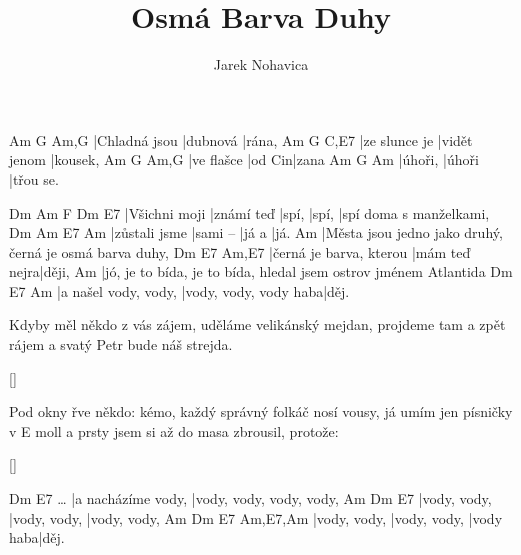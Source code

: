 \documentclass{song}
\author{Jarek Nohavica}
\title{Osmá Barva Duhy}
\begin{document}
\strophe
Am            G        Am,G
|Chladná jsou |dubnová |rána,
Am            G            C,E7
|ze slunce je |vidět jenom |kousek,
Am         G      Am,G
|ve flašce |od Cin|zana
Am      G      Am
|úhoři, |úhoři |třou se.
\endstrophe

Dm            Am         F     Dm    E7
|Všichni moji |známí teď |spí, |spí, |spí doma s manželkami,
Dm            Am       E7    Am
|zůstali jsme |sami -- |já a |já.
Am
|Města jsou jedno jako druhý, černá je osmá barva duhy,
Dm                      E7            Am,E7
|černá je barva, kterou |mám teď nejra|ději,
Am
|jó, je to bída, je to bída, hledal jsem ostrov jménem Atlantida
Dm                   E7                    Am
|a našel vody, vody, |vody, vody, vody haba|děj.
\endstrophe

\strophe*
Kdyby měl někdo z vás zájem,
uděláme velikánský mejdan,
projdeme tam a zpět rájem
a svatý Petr bude náš strejda.
\endstrophe

\ref{}

\strophe*
Pod okny řve někdo: kémo,
každý správný folkáč nosí vousy,
já umím jen písničky v E moll
a prsty jsem si až do masa zbrousil, protože:
\endstrophe

\ref{}

\strophe
         Dm                 E7
\ldots{} |a nacházíme vody, |vody, vody, vody, vody,
Am           Dm           E7
|vody, vody, |vody, vody, |vody, vody,
Am           Dm           E7        Am,E7,Am
|vody, vody, |vody, vody, |vody haba|děj.
\endstrophe
\end{document}
